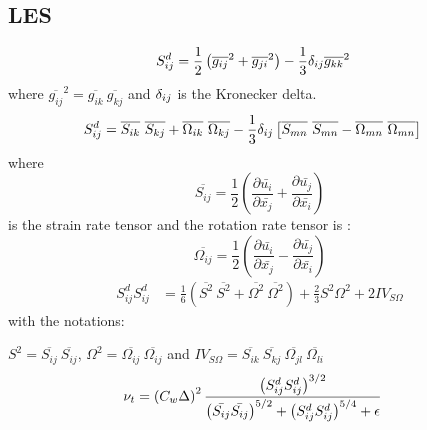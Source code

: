 \subsection{LES}
%
\begin{equation}
\label{traceless tensor}
\begin{split}
{{S}^d_{ij}} &= \frac{1}{2}\left(\overline{g_{ij}}^2 + \overline{g_{ji}}^2 \right) - \frac{1}{3}\delta_{ij}\overline{g_{kk}}^2
\end{split}
\end{equation}
%
where $ \overline{g_{ij}}^2 = \overline{g_{ik}}\  \overline{g_{kj}} $ and $\delta_{ij}$ is the Kronecker delta.
%
\begin{equation}
\label{traceless tensor-1}
\begin{split}
{{S}^d_{ij}} &= \overline{S_{ik}}\  \overline{S_{kj}} + \overline{\Omega_{ik}}\  \overline{\Omega_{kj}} - \frac{1}{3}\delta_{ij}\left[\overline{S_{mn}}\  \overline{S_{mn}} - \overline{\Omega_{mn}}\  \overline{\Omega_{mn}}\right]
\end{split}
\end{equation}
%
where $$\overline{S_{ij}} = \frac{1}{2}\left(\frac{\partial{\bar{u_i}}}{\partial{\bar{x_j}}} + \frac{\partial{\bar{u_j}}}{\partial{\bar{x_i}}}\right)$$ is the strain rate tensor and the rotation rate tensor is : $$\overline{\Omega_{ij}} = \frac{1}{2}\left(\frac{\partial{\bar{u_i}}}{\partial{\bar{x_j}}} - \frac{\partial{\bar{u_j}}}{\partial{\bar{x_i}}}\right)$$
%
%
\begin{equation}
\label{traceless tensor-2}
\begin{split}
{{S}^d_{ij}}{{S}^d_{ij}} &= \frac{1}{6}\left(\overline{S^2}\  \overline{S^2} + \overline{\Omega^2}\  \overline{\Omega^2}\right)  + \frac{2}{3}{S^2}{\Omega^2} +2IV_{S\Omega}
\end{split}
\end{equation}
%
with the notations:

${S^2} = \overline{S_{ij}}\ \overline{S_{ij}}$, ${\Omega^2} = \overline{\Omega_{ij}}\ \overline{\Omega_{ij}}$ and $IV_{S\Omega} = \overline{S_{ik}}\ \overline{S_{kj}}\ \overline{\Omega_{jl}}\ \overline{\Omega_{li}}$
\begin{equation}
\label{eddy-viscosity}
\begin{split}
{\nu_t} &= \left({C_w}{\Delta}\right)^{2}
\frac{\left({S_{ij}^{d}}{S_{ij}^{d}}\right)^{3/2}}{\left(\bar{S_{ij}} \bar{S_{ij}}\right)^{5/2} + {\left({S_{ij}^{d}}{S_{ij}^{d}}\right)^{5/4}} + \epsilon}
\end{split}
\end{equation}
%